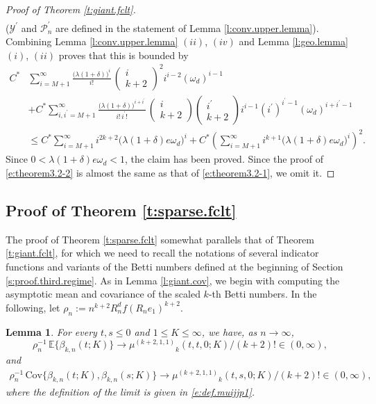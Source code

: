 \documentclass[11pt]{amsart}
\numberwithin{equation}{section}
\theoremstyle{plain}
\newtheorem{lemma}[theorem]{Lemma}
\theoremstyle{definition}
\begin{document}
\begin{proof}[Proof of Theorem \ref{t:giant.fclt}]
\begin{align*}
\end{align*}
(${{\mathcal{Y}^{\prime}}}$ and ${\mathcal P_n^{\prime}}$ are defined in the statement of Lemma \ref{l:conv.upper.lemma}). \\
Combining Lemma \ref{l:conv.upper.lemma} $(ii)$, $(iv)$ and Lemma \ref{l:geo.lemma} $(i)$, $(ii)$ proves that this is bounded by
\begin{align*}
C^* &\sum_{i=M+1}^\infty \frac{\bigl( \lambda (1+\delta) \bigr)^i}{i!}\, \begin{pmatrix} i \\ k+2 \end{pmatrix}^2 i^{i-2} (\omega_d)^{i-1}  \\
&+ C^* \sum_{i, {i^{\prime}} =M+1}^\infty \frac{\bigl( \lambda (1+\delta) \bigr)^{i+{i^{\prime}}}}{i!\, {i^{\prime}} !}\, \begin{pmatrix} i \\ k+2 \end{pmatrix} \begin{pmatrix} {i^{\prime}} \\ k+2 \end{pmatrix} i^{i-1} ({i^{\prime}})^{{i^{\prime}}-1} (\omega_d)^{i+{i^{\prime}}-1} \\
&\leq C^* \sum_{i=M+1}^\infty i^{2k+2} \bigl( \lambda (1+\delta) e\omega_d \bigr)^i  + C^* \left( \sum_{i=M+1}^\infty i^{k+1} \bigl( \lambda (1+\delta) e\omega_d \bigr)^i \right)^2.
\end{align*}
Since $0<\lambda (1+\delta) e\omega_d < 1$, the claim has been proved.
Since the proof of \eqref{e:theorem3.2-2} is almost the same as that of \eqref{e:theorem3.2-1}, we omit it.
\end{proof}

\subsection{Proof of Theorem \ref{t:sparse.fclt}}  \label{s:proof.second.regime}

The proof of Theorem \ref{t:sparse.fclt} somewhat parallels that of Theorem \ref{t:giant.fclt}, for which we need to recall the notations of several indicator functions and variants of the Betti numbers defined at the beginning of Section \ref{s:proof.third.regime}. As in Lemma \ref{l:giant.cov}, we begin with computing the asymptotic mean and covariance of the scaled $k$-th Betti numbers. In the following, let $\rho_n := n^{k+2}R_n^d f(R_ne_1)^{k+2}$.
\begin{lemma}  \label{l:sparse.cov}
For every $t, s \leq 0$ and $1\leq K\leq \infty$, we have, as $n\to \infty$,
$$
\rho_n^{-1}\, {\mathbb{E}} \bigl\{ \beta_{k,n}(t; K) \bigr\} \to {\mu^{(k+2,1,1)}}_k (t,t,0; K) / (k+2)! \in (0,\infty),
$$
and
\begin{align*}
\rho_n^{-1}\, \text{Cov} \bigl\{ \beta_{k,n}(t; K), \beta_{k,n}(s; K) \bigr\} \to {\mu^{(k+2,1,1)}}_k (t,s,0; K) / (k+2)! \in (0,\infty),
\end{align*}
where the definition of the limit is given in \eqref{e:def.muijjp1}.
\end{lemma}
\end{document}

